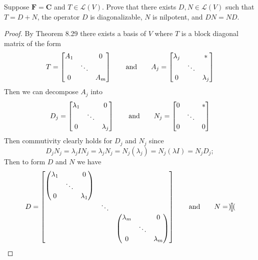 Suppose $\mathbf{F} = \mathbf{C}$ and $T \in \mathcal{L}(V)$.  Prove that there exists $D, N \in  \mathcal{L}(V)$ such that $T = D + N$, the operator $D$ is diagonalizable, $N$ is nilpotent, and $DN = ND$.

\begin{proof}
    By Theorem 8.29 there exists a basis of $V$ where $T$ is a block diagonal matrix of the form 
    $$T = \begin{bmatrix}
        A_1 & & 0 \\ & \ddots & \\ 0 & & A_m
    \end{bmatrix} \wideand A_j = \begin{bmatrix}
        \lambda_j & & \ast \\ & \ddots & \\ 0 & & \lambda_j
    \end{bmatrix}$$
    Then we can decompose $A_j$ into 
    $$D_j = \begin{bmatrix}
        \lambda_1 & & 0 \\ & \ddots & \\ 0 & & \lambda_j
    \end{bmatrix} \wideand N_j = \begin{bmatrix}
        0 & & \ast \\ & \ddots & \\ 0 & & 0
    \end{bmatrix}$$
    Then commutivity clearly holds for $D_j$ and $N_j$ since
    $$D_jN_j = \lambda_j I N_j = \lambda_j N_j = N_j (\lambda_j) = N_j (\lambda I) = N_j D_j;$$
    Then to form $D$ and $N$ we have 
    $$D = \begin{bmatrix}
        \begin{pmatrix}
            \lambda_1 & & 0 \\
            & \ddots & \\
            0 & & \lambda_1
        \end{pmatrix}
        & & \\
        &         \ddots & \\
        & &         \begin{pmatrix}
            \lambda_m & & 0 \\
            & \ddots & \\
            0 & & \lambda_m
        \end{pmatrix}
    \end{bmatrix} \wideand 
    N = \begin{bmatrix}
        \begin{pmatrix}

\end{pmatrix}
\end{bmatrix}$$
\end{proof}
